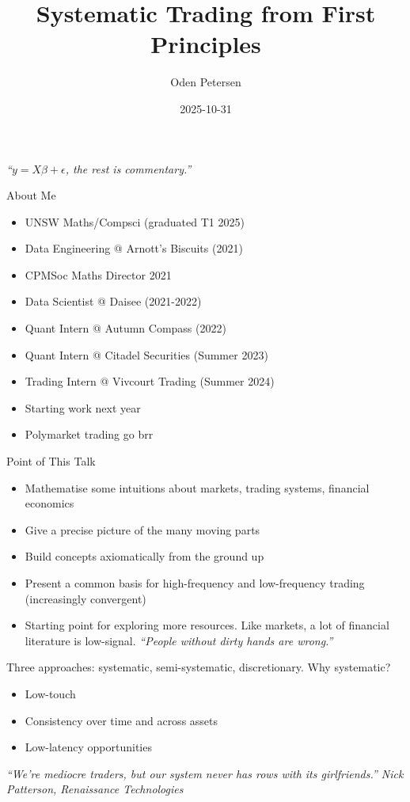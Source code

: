 \documentclass{beamer}
\title[\texttt{/trading-presentation}]{Systematic Trading from First Principles}
\author[\texttt{github.com/odenpetersen}]{Oden Petersen}
\date{2025-10-31}
\begin{document}
\begin{frame}
	\titlepage
	\begin{center}
		\textit{``$y=X\beta+\epsilon$, the rest is commentary.''}
	\end{center}
\end{frame}

\begin{frame}{About Me}
	\begin{itemize}
		\item UNSW Maths/Compsci (graduated T1 2025)
		\item Data Engineering @ Arnott's Biscuits (2021)
		\item CPMSoc Maths Director 2021
		\item Data Scientist @ Daisee (2021-2022)
		\item Quant Intern @ Autumn Compass (2022)
		\item Quant Intern @ Citadel Securities (Summer 2023)
		\item Trading Intern @ Vivcourt Trading (Summer 2024)
		\item Starting work next year
		\item Polymarket trading go brr
	\end{itemize}
\end{frame}

\begin{frame}{Point of This Talk}
	\begin{itemize}
		\item Mathematise some intuitions about markets, trading systems, financial economics
		\item Give a precise picture of the many moving parts
		\item Build concepts axiomatically from the ground up
		\item Present a common basis for high-frequency and low-frequency trading (increasingly convergent)
		\item Starting point for exploring more resources. Like markets, a lot of financial literature is low-signal. \textit{``People without dirty hands are wrong.''}
	\end{itemize}

	Three approaches: systematic, semi-systematic, discretionary. Why systematic?
	\begin{itemize}
		\item Low-touch
		\item Consistency over time and across assets
		\item Low-latency opportunities
	\end{itemize}
	\textit{``We’re mediocre traders, but our system never has rows with its girlfriends.'' Nick Patterson, Renaissance Technologies}
\end{frame}
\end{document}
